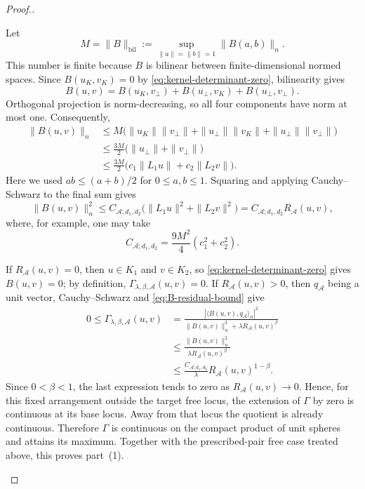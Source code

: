 \documentclass[10pt,a4paper]{amsart}
\begin{document}
\begin{proof}[Proof.]
\begin{itemize}
Let
\[
M=\|B\|_{\mathrm{bil}}
:=
\sup_{\|a\|=\|b\|=1}\|B(a,b)\|_n.
\]
This number is finite because $B$ is bilinear between finite-dimensional normed spaces. Since $B(u_K,v_K)=0$ by \eqref{eq:kernel-determinant-zero}, bilinearity gives
\[
B(u,v)
=
B(u_K,v_\perp)
+B(u_\perp,v_K)
+B(u_\perp,v_\perp).
\]
Orthogonal projection is norm-decreasing, so all four components have norm at most one. Consequently,
\begin{align*}
\|B(u,v)\|_n
&\leq
M\bigl(
\|u_K\|\|v_\perp\|
+\|u_\perp\|\|v_K\|
+\|u_\perp\|\|v_\perp\|
\bigr)\\
&\leq
\frac{3M}{2}
\bigl(\|u_\perp\|+\|v_\perp\|\bigr)\\
&\leq
\frac{3M}{2}
\bigl(c_1\|L_1u\|+c_2\|L_2v\|\bigr).
\end{align*}
Here we used $ab\leq(a+b)/2$ for $0\leq a,b\leq1$. Squaring and applying Cauchy--Schwarz to the final sum gives
\begin{equation}
\label{eq:B-residual-bound}
\|B(u,v)\|_n^2
\leq
C_{\mathcal{A};d_1,d_2}
\bigl(\|L_1u\|^2+\|L_2v\|^2\bigr)
=
C_{\mathcal{A};d_1,d_2}R_{\mathcal{A}}(u,v),
\end{equation}
where, for example, one may take
\[
C_{\mathcal{A};d_1,d_2}
=
\frac{9M^2}{4}(c_1^2+c_2^2).
\]

If $R_{\mathcal{A}}(u,v)=0$, then $u\in K_1$ and $v\in K_2$, so \eqref{eq:kernel-determinant-zero} gives $B(u,v)=0$; by definition, $\Gamma_{\lambda,\beta,\mathcal{A}}(u,v)=0$. If $R_{\mathcal{A}}(u,v)>0$, then $q_{\mathcal{A}}$ being a unit vector, Cauchy--Schwarz and \eqref{eq:B-residual-bound} give
\begin{align}
0\leq\Gamma_{\lambda,\beta,\mathcal{A}}(u,v)
&=
\frac{|\langle B(u,v),q_{\mathcal{A}}\rangle_n|^2}
{\|B(u,v)\|_n^2+\lambda R_{\mathcal{A}}(u,v)^\beta}
\nonumber\\
&\leq
\frac{\|B(u,v)\|_n^2}
{\lambda R_{\mathcal{A}}(u,v)^\beta}
\nonumber\\
&\leq
\frac{C_{\mathcal{A};d_1,d_2}}{\lambda}
R_{\mathcal{A}}(u,v)^{1-\beta}.
\label{eq:Gamma-base-bound}
\end{align}
Since $0<\beta<1$, the last expression tends to zero as $R_{\mathcal{A}}(u,v)\to0$. Hence, for this fixed arrangement outside the target free locus, the extension of $\Gamma$ by zero is continuous at its base locus. Away from that locus the quotient is already continuous. Therefore $\Gamma$ is continuous on the compact product of unit spheres and attains its maximum. Together with the prescribed-pair free case treated above, this proves part~(1).



\end{itemize}
\end{proof}
\end{document}
